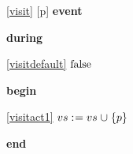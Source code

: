 \noindent \ref{visit} [p] \textbf{event}
\begin{block}
  \item   \textbf{during}
  \begin{block}
  \item[ \eqref{visitdefault} ]\sout{$\text{false}$} %
  \end{block}
  \item   \textbf{begin}
  \begin{block}
  \item[ \eqref{visitact1} ]{$vs \mathrel{:\mkern1mu=} vs \mathbin{\mkern1mu\cup\mkern1mu} \{ p \} $} %
  \end{block}
  \item   \textbf{end} \\
\end{block}
